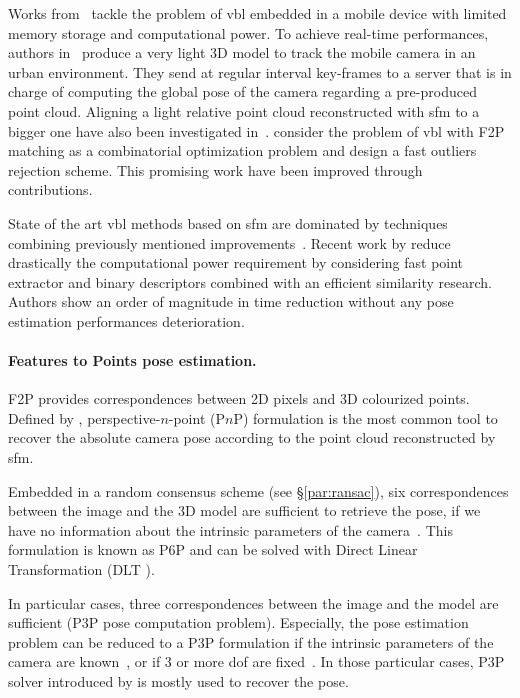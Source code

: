 Works from~\citep{Middelberg2014,Lynen2015} tackle the problem of \ac{vbl} embedded in a mobile device with limited memory storage and computational power. To achieve real-time performances, authors in~\citep{Middelberg2014} produce a very light 3D model to track the mobile camera in an urban environment. They send at regular interval key-frames to a server that is in charge of computing the global pose of the camera regarding a pre-produced point cloud. Aligning a light relative point cloud reconstructed with \ac{sfm} to a bigger one have also been investigated in~\citep{Lu2015}. \citet{Svarm2014} consider the problem of \ac{vbl} with F2P matching as a combinatorial optimization problem and design a fast outliers rejection scheme. This promising work have been improved through~\citep{Zeisl2015,Svarm2016} contributions.

State of the art \ac{vbl} methods based on \ac{sfm} are dominated by techniques combining previously mentioned improvements~\citep{Sattler2016a}. Recent work by \citet{Feng2016a} reduce drastically the computational power requirement by considering fast point extractor and binary descriptors combined with an efficient similarity research. Authors show an order of magnitude in time reduction without any pose estimation performances deterioration.

\paragraph{Features to Points pose estimation.}
F2P provides correspondences between 2D pixels and 3D colourized points. Defined by \citet{Hartley2003}, perspective-$n$-point (P$n$P) formulation is the most common tool to recover the absolute camera pose according to the point cloud reconstructed by \ac{sfm}.

Embedded in a random consensus scheme (see \S\ref{par:ransac}), six correspondences between the image and the 3D model are sufficient to retrieve the pose, if we have no information about the intrinsic parameters of the camera~\citep{Donoser2014,Li2010,Li2010,Heisterklaus2014}. This formulation is known as P6P and can be solved with Direct Linear Transformation (DLT \citep{Hartley2003}).

In particular cases, three correspondences between the image and the model are sufficient (P3P pose computation problem). Especially, the pose estimation problem can be reduced to a P3P formulation if the intrinsic parameters of the camera are known~\citep{Irschara2009,Middelberg2014}, or if 3 or more \ac{dof} are fixed~\citep{Zeisl2015,Qu2016}. In those particular cases, P3P solver introduced by \citet{Kneip2011} is mostly used to recover the pose. 

